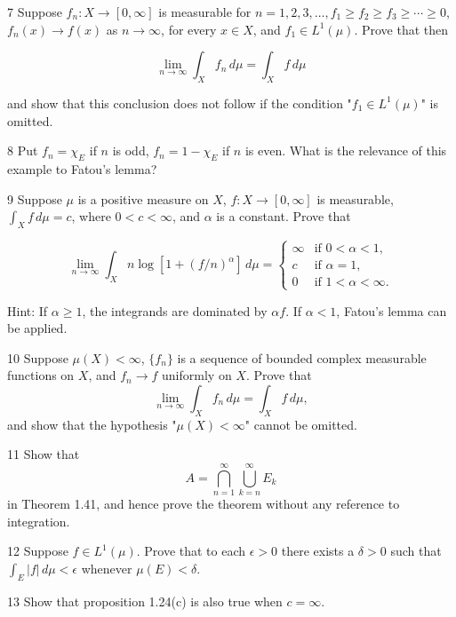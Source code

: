 \documentclass[11pt]{article}
\begin{document}
7 Suppose \(f_n: X \rightarrow [0, \infty]\) is measurable for \(n = 1, 2, 3, \ldots, f_1 \geq f_2 \geq f_3 \geq \cdots \geq 0\), \(f_n(x) \rightarrow f(x)\) as \(n \rightarrow \infty\), for every \(x \in X\), and \(f_1 \in L^1(\mu)\). Prove that then

\[
\lim_{n \rightarrow \infty} \int_X f_n \, d\mu = \int_X f \, d\mu
\]

and show that this conclusion does not follow if the condition "\(f_1 \in L^1(\mu)\)" is omitted.

8 Put \(f_n = \chi_E\) if \(n\) is odd, \(f_n = 1 - \chi_E\) if \(n\) is even. What is the relevance of this example to Fatou's lemma?

9 Suppose \(\mu\) is a positive measure on \(X\), \(f: X \rightarrow [0, \infty]\) is measurable, \(\int_X f \, d\mu = c\), where \(0 < c < \infty\), and \(\alpha\) is a constant. Prove that

\[\lim_{n \rightarrow \infty} \int_X n \log \left[ 1 + (f/n)^\alpha \right] \, d\mu =
\begin{cases}
\infty & \text{if } 0 < \alpha < 1, \\
c & \text{if } \alpha = 1, \\
0 & \text{if } 1 < \alpha < \infty.
\end{cases}\]

Hint: If \(\alpha \geq 1\), the integrands are dominated by \(\alpha f\). If \(\alpha < 1\), Fatou's lemma can be applied.

10 Suppose \(\mu(X) < \infty\), \(\{f_n\}\) is a sequence of bounded complex measurable functions on \(X\), and \(f_n \rightarrow f\) uniformly on \(X\). Prove that
\[
\lim_{n \rightarrow \infty} \int_X f_n \, d\mu = \int_X f \, d\mu,
\]
and show that the hypothesis "\(\mu(X) < \infty\)" cannot be omitted.

11 Show that
\[
A = \bigcap_{n=1}^{\infty} \bigcup_{k=n}^{\infty} E_k
\]
in Theorem 1.41, and hence prove the theorem without any reference to integration.

12 Suppose \(f \in L^1(\mu)\). Prove that to each \(\epsilon > 0\) there exists a \(\delta > 0\) such that \(\int_E |f| \, d\mu < \epsilon\) whenever \(\mu(E) < \delta\).

13 Show that proposition 1.24(c) is also true when \(c = \infty\).
\end{document}

